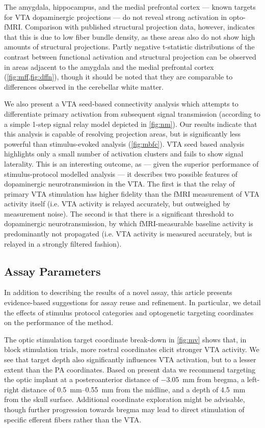 The amygdala, hippocampus, and the medial prefrontal cortex --- known targets for VTA dopaminergic projections --- do not reveal strong activation in opto-fMRI.
Comparison with published structural projection data, however, indicates that this is due to low fiber bundle density, as these areas also do not show high amounts of structural projections.
Partly negative t-statistic distributions of the contrast between functional activation and structural projection can be observed in areas adjacent to the amygdala and the medial prefrontal cortex (\cref{fig:mff,fig:dffn}), though it should be noted that they are comparable to differences observed in the cerebellar white matter.

We also present a VTA seed-based connectivity analysis which attempts to differentiate primary activation from subsequent signal transmission (according to a simple 1-step signal relay model depicted in \cref{fig:nm}).
Our results indicate that this analysis is capable of resolving projection areas, but is significantly less powerful than stimulus-evoked analysis (\cref{fig:mbfc}).
VTA seed based analysis highlights only a small number of activation clusters and fails to show signal laterality.
This is an interesting outcome, as --- given the superior performance of stimulus-protocol modelled analysis --- it describes two possible features of dopaminergic neurotransmission in the VTA.
The first is that the relay of primary VTA stimulation has higher fidelity than the fMRI measurement of VTA activity itself (i.e. VTA activity is relayed accurately, but outweighed by measurement noise).
The second is that there is a significant threshold to dopaminergic neurotransmission, by which fMRI-measurable baseline activity is predominantly not propagated (i.e. VTA activity is measured accurately, but is relayed in a strongly filtered fashion).

\subsection{Assay Parameters}

In addition to describing the results of a novel assay, this article presents evidence-based suggestions for assay reuse and refinement.
In particular, we detail the effects of stimulus protocol categories and optogenetic targeting coordinates on the performance of the method.

The optic stimulation target coordinate break-down in \cref{fig:mv} shows that, in block stimulation trials, more rostral coordinates elicit stronger VTA activity.
We see that target depth also significantly influences VTA activation, but to a lesser extent than the PA coordinates.
Based on present data we recommend targeting the optic implant at
a posteroanterior distance of \SI{-3.05}{\milli\meter} from bregma,
a left-right distance of \SIrange{0.5}{0.55}{\milli\meter} from the midline,
and a depth of \SI{4.5}{\milli\meter} from the skull surface.
Additional coordinate exploration might be advisable, though further progression towards bregma may lead to direct stimulation of specific efferent fibers rather than the VTA.

